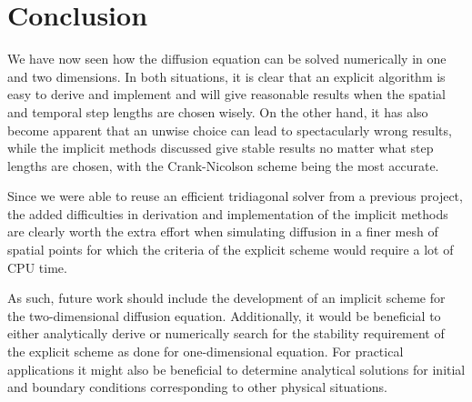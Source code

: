 \section{Conclusion}
We have now seen how the diffusion equation can be solved numerically in one and two dimensions. In both situations, it is clear that an explicit algorithm is easy to derive and implement and will give reasonable results when the spatial and temporal step lengths are chosen wisely. On the other hand, it has also become apparent that an unwise choice can lead to spectacularly wrong results, while the implicit methods discussed give stable results no matter what step lengths are chosen, with the Crank-Nicolson scheme being the most accurate.

Since we were able to reuse an efficient tridiagonal solver from a previous project, the added difficulties in derivation and implementation of the implicit methods are clearly worth the extra effort when simulating diffusion in a finer mesh of spatial points for which the criteria of the explicit scheme would require a lot of CPU time.

As such, future work should include the development of an implicit scheme for the two-dimensional diffusion equation. Additionally, it would be beneficial to either analytically derive or numerically search for the stability requirement of the explicit scheme as done for one-dimensional equation. For practical applications it might also be beneficial to determine analytical solutions for initial and boundary conditions corresponding to other physical situations.
